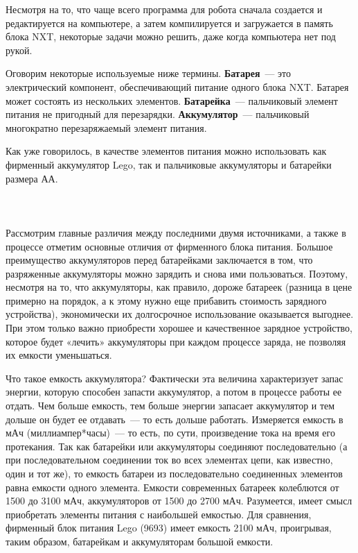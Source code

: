 Несмотря на то, что чаще всего программа для робота сначала создается и редактируется на компьютере, а затем компилируется и загружается в память блока NXT, некоторые задачи можно решить, даже когда компьютера нет под рукой. 

Оговорим некоторые используемые ниже термины. {\bfseries Батарея}~--- это электрический компонент, обеспечивающий питание одного блока NXT. Батарея может состоять из нескольких элементов. {\bfseries Батарейка}~--- пальчиковый элемент питания не пригодный для перезарядки. {\bfseries Аккумулятор}~--- пальчиковый многократно перезаряжаемый элемент питания. 

Как уже говорилось, в качестве элементов питания можно использовать как фирменный аккумулятор Lego, так и пальчиковые аккумуляторы и батарейки размера АА.\\\\
\\\\

Рассмотрим главные различия между последними двумя источниками, а также в процессе отметим основные отличия от фирменного блока питания. Большое преимущество аккумуляторов перед батарейками заключается в том, что разряженные аккумуляторы можно зарядить и снова ими пользоваться. Поэтому, несмотря на то, что аккумуляторы, как правило, дороже батареек (разница в цене примерно на порядок, а к этому нужно еще прибавить стоимость зарядного устройства), экономически их долгосрочное использование оказывается выгоднее. При этом только важно приобрести хорошее и качественное зарядное устройство, которое будет «лечить» аккумуляторы при каждом процессе заряда, не позволяя их емкости уменьшаться.

Что такое емкость аккумулятора? Фактически эта величина характеризует запас энергии, которую способен запасти аккумулятор, а потом в процессе работы ее отдать. Чем больше емкость, тем больше энергии запасает аккумулятор и тем дольше он будет ее отдавать~--- то есть дольше работать. Измеряется емкость в мАч (миллиампер*часы)~--- то есть, по сути, произведение тока на время его протекания. Так как батарейки или аккумуляторы соединяют последовательно (а при последовательном соединении ток во всех элементах цепи, как известно, один и тот же), то емкость батареи из последовательно соединенных элементов равна емкости одного элемента. Емкости современных батареек колеблются от 1500 до 3100 мАч, аккумуляторов от 1500 до 2700 мАч. Разумеется, имеет смысл приобретать элементы питания с наибольшей емкостью. Для сравнения, фирменный блок питания Lego (9693) имеет емкость 2100 мАч, проигрывая, таким образом, батарейкам и аккумуляторам большой емкости.


